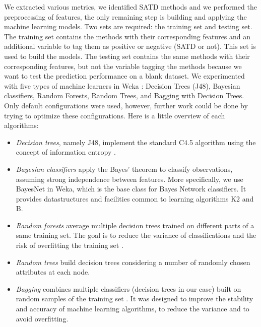  We extracted various metrics, we identified \ac{SATD} methods and we performed the preprocessing of features, the only remaining step is building and applying the machine learning models. Two sets are required: the training set and testing set. The training set contains the methods with their corresponding features and an additional variable to tag them as positive or negative (\ac{SATD} or not). This set is used to build the models. The testing set contains the same methods with their corresponding features, but not the variable tagging the methods because we want to test the prediction performance on a blank dataset. We experimented with five types of machine learners in Weka \citep{hall2009weka}: Decision Trees (J48), Bayesian classifiers, Random Forests, Random Trees, and Bagging with Decision Trees. Only default configurations were used, however, further work could be done by trying to optimize these configurations. Here is a little overview of each algorithms: \par 

\begin{itemize}
\item \textit{Decision trees}, namely J48, implement the standard C4.5 algorithm using the concept of information entropy \citep{Quinlan1993}.
\item \textit{Bayesian classifiers} apply the Bayes' theorem to classify observations, assuming strong independence between features. More specifically, we use BayesNet in Weka, which is the base class for Bayes Network classifiers. It provides datastructures and facilities common to learning algorithms K2 and B.
\item \textit{Random forests} average multiple decision trees trained on different parts of a same training set. The goal is to reduce the variance of classifications and the risk of overfitting the training set \citep{Breiman2001}.
\item \textit{Random trees} build decision trees considering a number of randomly chosen attributes at each node.
\item \textit{Bagging} combines multiple classifiers (decision trees in our case) built on random samples of the training set \citep{Breiman1996}. It was designed to improve the stability and accuracy of machine learning algorithms, to reduce the variance and to avoid overfitting.
\end{itemize}

